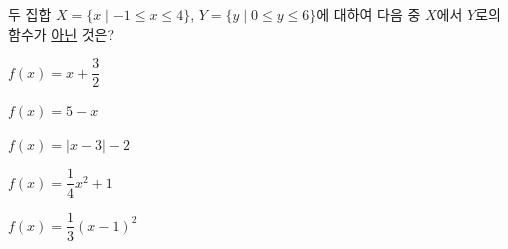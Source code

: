 두 집합 $X=\{x \mid -1\le x\le 4\}$, $Y=\{y \mid 0\le y\le 6\}$에 대하여 다음 중 $X$에서 $Y$로의 함수가 \underline{아닌} 것은?
\begin{choicesii}{\rule[-3ex]{0pt}{8ex}$f(x)=x+\dfrac{3}{2}$}{\rule[-3ex]{0pt}{8ex}$f(x)=5-x$}{\rule[-3ex]{0pt}{8ex}$f(x)=|x-3|-2$}{\rule[-3ex]{0pt}{8ex}$f(x)=\dfrac{1}{4}x^2+1$}{\rule[-3ex]{0pt}{8ex}$f(x)=\dfrac{1}{3}(x-1)^2$}\end{choicesii}

